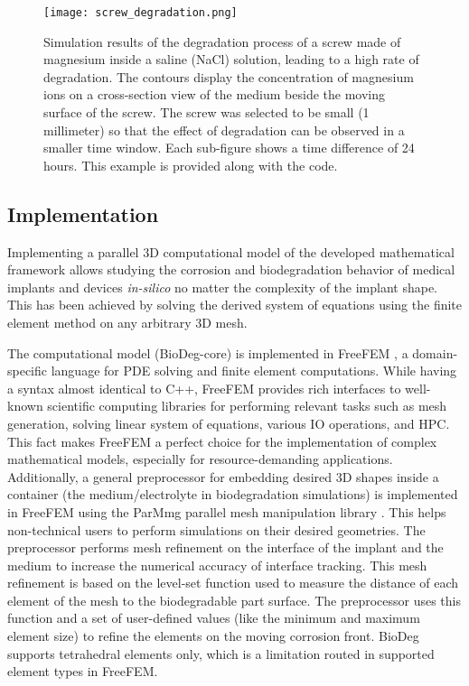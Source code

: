 \begin{figure}[h]
\centering
\medskip
\texttt{[image: screw\_degradation.png]}
\caption[Simulation result of degradation of a screw performed using BioDeg]{Simulation results of the degradation process of a screw made of magnesium inside a saline (NaCl) solution, leading to a high rate of degradation. The contours display the concentration of magnesium ions on a cross-section view of the medium beside the moving surface of the screw. The screw was selected to be small (1 millimeter) so that the effect of degradation can be observed in a smaller time window. Each sub-figure shows a time difference of 24 hours. This example is provided along with the code.} \label{fig:screw_biodeg}
\end{figure}

\subsection{Implementation}

Implementing a parallel 3D computational model of the developed mathematical framework allows studying the corrosion and biodegradation behavior of medical implants and devices \textit{in-silico} no matter the complexity of the implant shape. This has been achieved by solving the derived system of equations using the finite element method on any arbitrary 3D mesh.

The computational model (BioDeg-core) is implemented in FreeFEM \cite{Hecht2012}, a domain-specific language for \gls{PDE} solving and finite element computations. While having a syntax almost identical to C++, FreeFEM provides rich interfaces to well-known scientific computing libraries for performing relevant tasks such as mesh generation, solving linear system of equations, various \gls{IO} operations, and \gls{HPC}. This fact makes FreeFEM a perfect choice for the implementation of complex mathematical models, especially for resource-demanding applications. Additionally, a general preprocessor for embedding desired 3D shapes inside a container (the medium/electrolyte in biodegradation simulations) is implemented in FreeFEM using the ParMmg parallel mesh manipulation library \cite{Dapogny2014}. This helps non-technical users to perform simulations on their desired geometries. The preprocessor performs mesh refinement on the interface of the implant and the medium to increase the numerical accuracy of interface tracking. This mesh refinement is based on the level-set function used to measure the distance of each element of the mesh to the biodegradable part surface. The preprocessor uses this function and a set of user-defined values (like the minimum and maximum element size) to refine the elements on the moving corrosion front. BioDeg supports tetrahedral elements only, which is a limitation routed in supported element types in FreeFEM.

